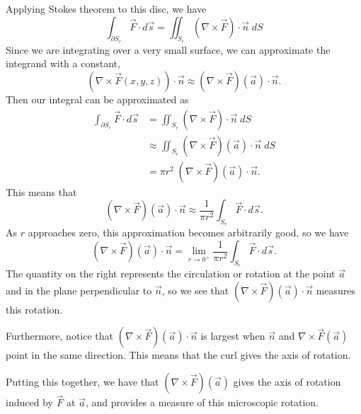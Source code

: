 \documentclass{ximera}
\begin{document}
Applying Stokes theorem to this disc, we have
\[
\int_{\partial S_r}\vec{F}\cdot d\vec{s} = \iint_{S_r} (\nabla\times \vec{F})\cdot \vec{n}\;dS
\]
Since we are integrating over a very small surface, we can approximate the integrand with a constant, 
\[
(\nabla\times \vec{F}(x,y,z))\cdot \vec{n} \approx (\nabla\times \vec{F})(\vec{a})\cdot \vec{n}.
\]
Then our integral can be approximated as
\begin{align*}
\int_{\partial S_r}\vec{F}\cdot d\vec{s} &= \iint_{S_r} (\nabla\times \vec{F})\cdot \vec{n}\;dS\\
&\approx \iint_{S_r} (\nabla\times \vec{F})(\vec{a})\cdot \vec{n}\;dS\\
& = \pi r^2\;(\nabla\times \vec{F})(\vec{a})\cdot \vec{n}.
\end{align*}
This means that 
\[
(\nabla\times \vec{F})(\vec{a})\cdot \vec{n} \approx \frac{1}{\pi r^2}\int_{S_r}\vec{F}\cdot d\vec{s}.
\]
As $r$ approaches zero, this approximation becomes arbitrarily good, so we have
\[
(\nabla\times \vec{F})(\vec{a})\cdot \vec{n} = \lim_{r\rightarrow 0^+} \frac{1}{\pi r^2}\int_{S_r}\vec{F}\cdot d\vec{s}.
\]
The quantity on the right represents the circulation or rotation at the point $\vec{a}$ and in the plane perpendicular to $\vec{n}$, so we see that $(\nabla\times \vec{F})(\vec{a})\cdot \vec{n}$ measures this rotation.

Furthermore, notice that $(\nabla\times \vec{F})(\vec{a})\cdot \vec{n}$ is largest when $\vec{n}$ and $\nabla\times \vec{F}(\vec{a})$ point in the same direction. This means that the curl gives the axis of rotation.

Putting this together, we have that $(\nabla\times \vec{F})(\vec{a})$ gives the axis of rotation induced by $\vec{F}$ at $\vec{a}$, and provides a measure of this microscopic rotation. 
\end{document}
